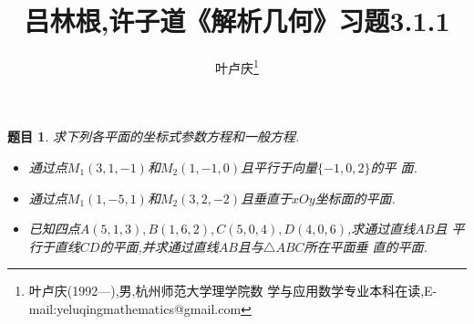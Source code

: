 \documentclass[a4paper]{article}
\newtheorem*{exe}{题目}
\newenvironment{exercise}
{\bigskip\begin{mdframed}\begin{exe}}
    {\end{exe}\end{mdframed}\bigskip}
\begin{document}
\title{\huge{\bf{吕林根,许子道《解析几何》习题3.1.1}}}
\author{\small{叶卢庆\footnote{叶卢庆(1992---),男,杭州师范大学理学院数
      学与应用数学专业本科在读,E-mail:yeluqingmathematics@gmail.com}}}
\maketitle
\begin{exercise}
  求下列各平面的坐标式参数方程和一般方程.
  \begin{itemize}
  \item 通过点$M_1(3,1,-1)$和$M_2(1,-1,0)$且平行于向量$\{-1,0,2\}$的平
    面.
  \item 通过点$M_1(1,-5,1)$和$M_2(3,2,-2)$且垂直于$xOy$坐标面的平面.
  \item 已知四点$A(5,1,3),B(1,6,2),C(5,0,4),D(4,0,6)$,求通过直线$AB$且
    平行于直线$CD$的平面,并求通过直线$AB$且与$\triangle ABC$所在平面垂
    直的平面.
  \end{itemize}
\end{exercise}
\end{document}
